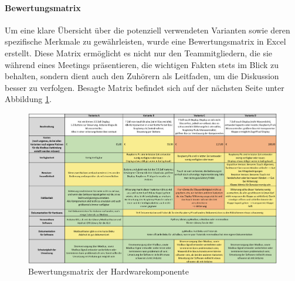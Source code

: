 \paragraph{Bewertungsmatrix}
Um eine klare Übersicht über die potenziell verwendeten Varianten sowie deren spezifische Merkmale zu gewährleisten, wurde eine Bewertungsmatrix in Excel erstellt. Diese Matrix ermöglicht es nicht nur den Teammitgliedern, die sie während eines Meetings präsentieren, die wichtigen Fakten stets im Blick zu behalten, sondern dient auch den Zuhörern als Leitfaden, um die Diskussion besser zu verfolgen. Besagte Matrix befindet sich auf der nächsten Seite unter Abbildung \ref{fig:matrix}.
\begin{landscape}
	\begin{figure}[H]
		\centering
		\includegraphics[width=1\linewidth]{Bilder/bewertungsmatrix}
		\caption{Bewertungsmatrix der Hardwarekomponente}
		\label{fig:matrix}
	\end{figure}
\end{landscape}